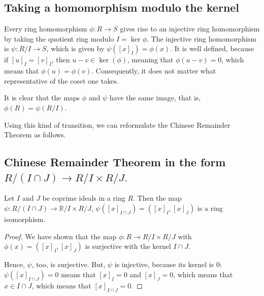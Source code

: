 \documentclass[11pt,a4paper]{amsart}
\newcommand{\R}{{\mathbb{R}}}
\begin{document}
\subsection{Taking a homomorphism modulo the kernel} Every ring homomorphism $\phi : R \to S$ gives rise to an injective ring homomorphism by taking the quotient ring modulo $I = \ker \phi$. The injective ring homomorphism is $\psi : R / I \to S$, which is given by $\psi( [x]_I ) = \phi(x)$. It is well defined, because if $[u]_I = [v]_I$, then $u - v \in \ker(\phi)$, meaning that $\phi(u-v) = 0$, which means that $\phi(u) = \phi(v)$. Consequently, it does not matter what representative of the coset one takes. 

It is clear that the maps $\phi$ and $\psi$ have the same image, that is, $\phi(R) = \psi(R / I)$. 

Using this kind of transition, we can reformulate the Chinese Remainder Theorem as follows. 



\subsection{Chinese Remainder Theorem in the form $R / (I \cap J) \to R / I \times R / J.$} Let $I$ and $J$ be coprime ideals in a ring $R$. Then the map $\psi : R / (I \cap J) \to \R / I \times R / J$, 
$\psi([x]_{I \cap J}) = ([x]_I, [x]_J)$ is a ring isomorphism. 

\begin{proof} 
We have shown that the map $\phi : R \to R / I \times R / J$ with $\phi(x) = ([x]_I, [x]_J)$ is surjective with the kernel $I \cap J$. 

 Hence, $\psi$, too, is surjective. But, $\psi$ is injective, because its kernel is $0$: $\psi([x]_{I\cap J} ) = 0$  means that $[x]_I = 0$ and $[x]_J =0$, which means that $x \in I \cap J$, which means that $[x]_{I \cap J} = 0$. 
\end{proof} 
\end{document}
